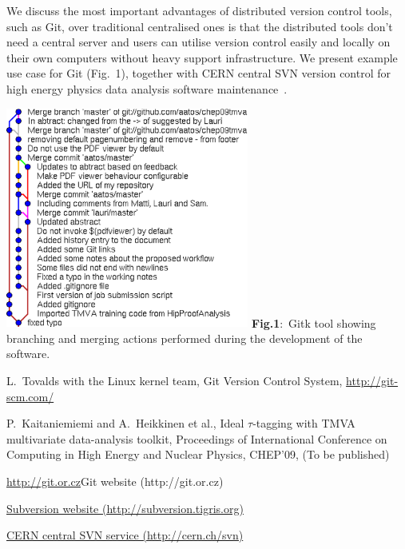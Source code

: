 \documentclass[12pt]{article}
\begin{document}
\begin{minipage}{6cm}
We discuss the most important advantages of distributed version control tools,
such as Git, over traditional centralised ones is that the distributed
tools don't need a central server and users can utilise
version control easily and locally on their own computers without
heavy support infrastructure.
We present example use case for Git (Fig.~1), 
together with CERN central SVN version control for high energy physics data
analysis software maintenance~\cite{pk09aProceedings}.

\end{minipage}
 \hfill
 \begin{minipage}{8cm}
\includegraphics[width=8cm]{gitk.eps} 
{\bf Fig.1}:~Gitk tool showing branching and merging actions
performed during the development of the software.
\end{minipage}


\begin{thebibliography}{9}
L.~Tovalds with the Linux kernel team,
Git Version Control System,
\href{http://git-scm.com/}{http://git-scm.com/}

P.~Kaitaniemiemi and A.~Heikkinen et al.,
Ideal $\tau$-tagging with TMVA multivariate data-analysis toolkit,
Proceedings of International Conference on 
Computing in High Energy and Nuclear Physics, CHEP'09,
(To be published)

\url{http://git.or.cz}{Git website (http://git.or.cz)}

\href{http://subversion.tigris.org}{Subversion website (http://subversion.tigris.org)}

\href{http://cern.ch/svn}{CERN central SVN service (http://cern.ch/svn)}
\end{thebibliography}
\end{document}
